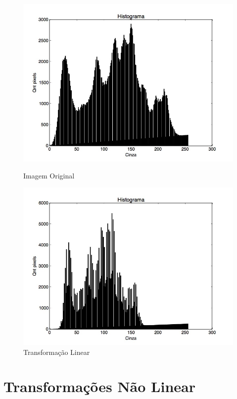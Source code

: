 \documentclass{article}
\begin{document}
\FloatBarrier
\begin{figure}[!htb]
\begin{minipage}[b]{0.45\linewidth}
\centering
\includegraphics[scale=0.25]{Histo_lena_B.jpg}
\caption{Imagem Original}
\label{fig:original}
\end{minipage}
\hspace{0.5cm}
\begin{minipage}[b]{0.45\linewidth}
\centering
\includegraphics[scale=0.25]{Histo_TransLinearSimples.jpg}
\caption{Transformação Linear}
\label{fig:rota}
\end{minipage}
\end{figure}
\FloatBarrier

\newpage
\section{Transformações Não Linear}
\end{document}
